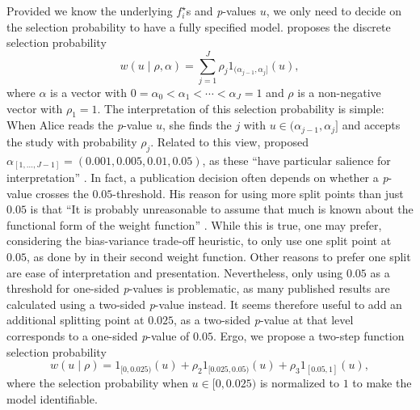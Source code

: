 \documentclass{article}
\theoremstyle{plain}
\theoremstyle{definition}
\begin{document}
Provided we know the underlying $f_{i}^{\star}$s and \textit{p}-values $u$, we only need to decide on the selection probability to have a fully specified model. \citet{hedges1992modeling} proposes the discrete selection probability
\begin{equation}
w(u\mid\rho,\alpha)=\sum_{j=1}^{J}\rho_{j}1_{(\alpha_{j-1},\alpha_{j}]}(u),\label{eq:Weighted model step function}
\end{equation}
where $\alpha$ is a vector with $0=\alpha_{0}<\alpha_{1}<\cdots<\alpha_{J}=1$ and $\rho$ is a non-negative vector with $\rho_{1}=1$. The interpretation of this selection probability is simple: When Alice reads the \textit{p}-value $u$, she finds the $j$ with $u\in(\alpha_{j-1},\alpha_{j}]$ and accepts the study with probability $\rho_{j}$. Related to this view, \citet{hedges1992modeling} proposed $\alpha_{[1,\dots,J-1]} = (0.001,0.005,0.01,0.05)$, as these \enquote{have particular salience for interpretation} \citep{hedges1992modeling}. In fact, a publication decision often depends on whether a \textit{p}-value crosses the $0.05$-threshold. His reason for using more split points than just $0.05$ is that \enquote{It is probably unreasonable to assume that much is known about the functional form of the weight function} \citep{hedges1992modeling}. While this is true, one may prefer, considering the bias-variance trade-off heuristic, to only use one split point at $0.05$, as done by \citet{iyengar1988selection} in their second weight function. Other reasons to prefer one split are ease of interpretation and presentation. Nevertheless, only using $0.05$ as a threshold for one-sided \textit{p}-values is problematic, as many published results are calculated using a two-sided \textit{p}-value instead. It seems therefore useful to add an additional splitting point at $0.025$, as a two-sided \textit{p}-value at that level corresponds to a one-sided \textit{p}-value of $0.05$. Ergo, we propose a two-step function selection probability
\[
w(u\mid\rho)=1_{[0,0.025)}(u)+\rho_{2}1_{[0.025,0.05)}(u)+\rho_{3}1_{\left[0.05,1\right]}(u),
\]
where the selection probability when $u\in[0,0.025)$ is normalized to $1$ to make the model identifiable.
\end{document}
